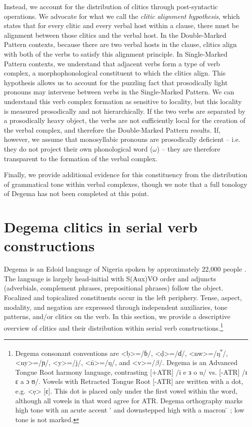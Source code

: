\documentclass[output=paper]{langsci/langscibook}
\begin{document}
Instead, we account for the distribution of clitics through post-syntactic operations. We advocate for what we call the \textit{clitic alignment hypothesis}, which states that for every clitic and every verbal host within a clause, there must be alignment between those clitics and the verbal host. In the Double-Marked Pattern contexts, because there are two verbal hosts in the clause, clitics align with both of the verbs to satisfy this alignment principle. In Single-Marked Pattern contexts, we understand that adjacent verbs form a type of verb complex, a morphophonological constituent to which the clitics align. This hypothesis allows us to account for the puzzling fact that prosodically light pronouns may intervene between verbs in the Single-Marked Pattern. We can understand this verb complex formation as sensitive to locality, but this locality is measured prosodically and not hierarchically. If the two verbs are separated by a prosodically heavy object, the verbs are not sufficiently local for the creation of the verbal complex, and therefore the Double-Marked Pattern results. If, however, we assume that monosyllabic pronouns are prosodically deficient – i.e. they do not project their own phonological word ($\omega $) – they are therefore transparent to the formation of the verbal complex. 

Finally, we provide additional evidence for this constituency from the distribution of grammatical tone within verbal complexes, though we note that a full tonology of Degema has not been completed at this point. 

\section{Degema clitics in serial verb constructions}

Degema is an Edoid language of Nigeria spoken by approximately 22,000 people \citep[5]{Kari2004}. The language is largely head-initial with S(Aux)VO order and adjuncts (adverbials, complement phrases, prepositional phrases) follow the object. Focalized and topicalized constituents occur in the left periphery. Tense, aspect, modality, and negation are expressed through independent auxiliaries, tone patterns, and/or clitics on the verb. In this section, we provide a descriptive overview of clitics and their distribution within serial verb constructions.\footnote{Degema consonant conventions are <ḅ>=/ɓ/, <ḍ>=/ɗ/, <nw>=/ŋ\textsuperscript{ʷ}/, <ny>=/ɲ/, <y>=/j/, <\={n}>=/ŋ/, and <v>=/$\beta $/. Degema is an Advanced Tongue Root harmony language, contrasting [+ATR] /i e ɜ o u/ vs. [-ATR] /ɪ ɛ a ɔ ʊ/. Vowels with Retracted Tongue Root [-ATR] are written with a dot, e.g. <ẹ> [ɛ]. This dot is placed only under the first vowel within the word, although all vowels in that word agree for ATR. Degema orthography marks high tone with an acute accent  \'{}  and downstepped high with a macron  \={}  ; low tone is not marked.
} 
\end{document}

